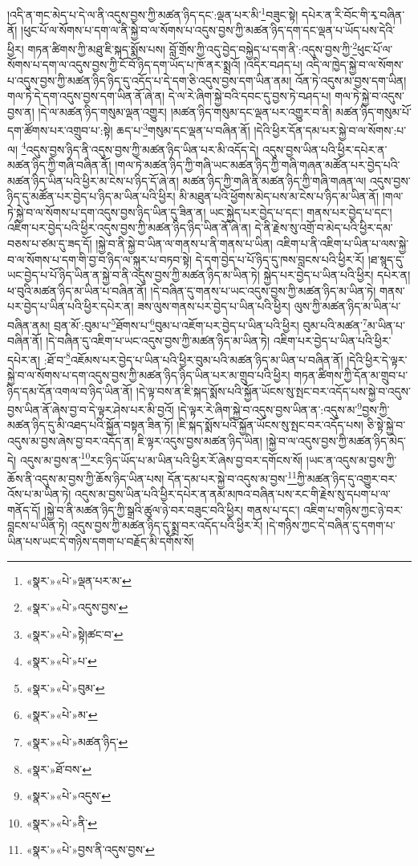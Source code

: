 །འདི་ན་གང་མེད་པ་དེ་ལ་ནི་འདུས་བྱས་ཀྱི་མཚན་ཉིད་དང་:ལྡན་པར་མི་\footnote{«སྣར་»«པེ་»ལྡན་པར་མ་}བཟུང་སྟེ། དཔེར་ན་རི་བོང་གི་རྭ་བཞིན་ནོ། །ཕུང་པོ་ལ་སོགས་པ་དག་ལ་ནི་སྐྱེ་བ་ལ་སོགས་པ་འདུས་བྱས་ཀྱི་མཚན་ཉིད་དག་དང་ལྡན་པ་ཡོད་པས་དེའི་ཕྱིར། གཏན་ཚིགས་ཀྱི་མཐུ་ཇི་སྐད་སྨོས་པས། བློ་གྲོས་ཀྱི་འདུ་བྱེད་བསྐྱེད་པ་དག་ནི་:འདུས་བྱས་ཀྱི་\footnote{«སྣར་»«པེ་»འདུས་བྱས་}ཕུང་པོ་ལ་སོགས་པ་དག་ལ་འདུས་བྱས་ཀྱི་ངོ་བོ་ཉིད་དག་ཡོད་པ་ཁོ་ནར་སྨྲའོ། །འདིར་བཤད་པ། འདི་ལ་ཁྱེད་སྐྱེ་བ་ལ་སོགས་པ་འདུས་བྱས་ཀྱི་མཚན་ཉིད་ཉིད་དུ་འདོད་པ་དེ་དག་ཅི་འདུས་བྱས་དག་ཡིན་ནམ། འོན་ཏེ་འདུས་མ་བྱས་དག་ཡིན། གལ་ཏེ་དེ་དག་འདུས་བྱས་དག་ཡིན་ནོ་ཞེ་ན། དེ་ལ་རེ་ཞིག་སྐྱེ་བའི་དབང་དུ་བྱས་ཏེ་བཤད་པ། གལ་ཏེ་སྐྱེ་བ་འདུས་བྱས་ན། །དེ་ལ་མཚན་ཉིད་གསུམ་ལྡན་འགྱུར། །མཚན་ཉིད་གསུམ་དང་ལྡན་པར་འགྱུར་བ་ནི། མཚན་ཉིད་གསུམ་པོ་དག་ཚོགས་པར་འགྲུབ་པ་:སྟེ། ཆད་པ་\footnote{«སྣར་»«པེ་»སྟེ།ཚང་བ་}གསུམ་དང་ལྡན་པ་བཞིན་ནོ། །དེའི་ཕྱིར་དོན་དམ་པར་སྐྱེ་བ་ལ་སོགས་:པ་ལ། \footnote{«སྣར་»«པེ་»པ་}འདུས་བྱས་ཉིད་ནི་འདུས་བྱས་ཀྱི་མཚན་ཉིད་ཡིན་པར་མི་འདོད་དེ། འདུས་བྱས་ཡིན་པའི་ཕྱིར་དཔེར་ན་མཚན་ཉིད་ཀྱི་གཞི་བཞིན་ནོ། །གལ་ཏེ་མཚན་ཉིད་ཀྱི་གཞི་ཡང་མཚན་ཉིད་ཀྱི་གཞི་གཞན་མཚོན་པར་བྱེད་པའི་མཚན་ཉིད་ཡིན་པའི་ཕྱིར་མ་ངེས་པ་ཉིད་དོ་ཞེ་ན། མཚན་ཉིད་ཀྱི་གཞི་ནི་མཚན་ཉིད་ཀྱི་གཞི་གཞན་ལ། འདུས་བྱས་ཉིད་དུ་མཚོན་པར་བྱེད་པ་ཉིད་མ་ཡིན་པའི་ཕྱིར། མི་མཐུན་པའི་ཕྱོགས་མེད་པས་མ་ངེས་པ་ཉིད་མ་ཡིན་ནོ། །གལ་ཏེ་སྐྱེ་བ་ལ་སོགས་པ་དག་འདུས་བྱས་ཉིད་ཡིན་དུ་ཟིན་ན། ཡང་སྐྱེད་པར་བྱེད་པ་དང་། གནས་པར་བྱེད་པ་དང་། འཇིག་པར་བྱེད་པའི་ཕྱིར་འདུས་བྱས་ཀྱི་མཚན་ཉིད་ཉིད་ཡིན་ནོ་ཞེ་ན། དེ་ནི་རྗེས་སུ་འགྲོ་བ་མེད་པའི་ཕྱིར་དམ་བཅས་པ་ཙམ་དུ་ཟད་དོ། །སྐྱེ་བ་ནི་སྐྱེ་བ་ཡིན་ལ་གནས་པ་ནི་གནས་པ་ཡིན། འཇིག་པ་ནི་འཇིག་པ་ཡིན་པ་ལས་སྐྱེ་བ་ལ་སོགས་པ་དག་གི་བྱ་བ་ཉིད་ལ་སྐུར་པ་བཏབ་སྟེ། དེ་དག་བྱེད་པ་པོ་ཉིད་དུ་ཁས་བླངས་པའི་ཕྱིར་རོ། །ཐ་སྙད་དུ་ཡང་བྱེད་པ་པོ་ཉིད་ཡིན་ན་སྐྱེ་བ་ནི་འདུས་བྱས་ཀྱི་མཚན་ཉིད་མ་ཡིན་ཏེ། སྐྱེད་པར་བྱེད་པ་ཡིན་པའི་ཕྱིར། དཔེར་ན། ཕ་བུའི་མཚན་ཉིད་མ་ཡིན་པ་བཞིན་ནོ། །དེ་བཞིན་དུ་གནས་པ་ཡང་འདུས་བྱས་ཀྱི་མཚན་ཉིད་མ་ཡིན་ཏེ། གནས་པར་བྱེད་པ་ཡིན་པའི་ཕྱིར་དཔེར་ན། ཟས་ལུས་གནས་པར་བྱེད་པ་ཡིན་པའི་ཕྱིར། ལུས་ཀྱི་མཚན་ཉིད་མ་ཡིན་པ་བཞིན་ནམ། བྲན་མོ་:བུམ་པ་\footnote{«སྣར་»«པེ་»བུམ་}ཐོགས་པ་\footnote{«སྣར་»«པེ་»མ་}བུམ་པ་འཇོག་པར་བྱེད་པ་ཡིན་པའི་ཕྱིར། བུམ་པའི་མཚན་\footnote{«སྣར་»«པེ་»མཚན་ཉིད་}མ་ཡིན་པ་བཞིན་ནོ། །དེ་བཞིན་དུ་འཇིག་པ་ཡང་འདུས་བྱས་ཀྱི་མཚན་ཉིད་མ་ཡིན་ཏེ། འཇིག་པར་བྱེད་པ་ཡིན་པའི་ཕྱིར་དཔེར་ན། :ཐོ་བ་\footnote{«སྣར་»ཐོ་བས་}འཇོམས་པར་བྱེད་པ་ཡིན་པའི་ཕྱིར་བུམ་པའི་མཚན་ཉིད་མ་ཡིན་པ་བཞིན་ནོ། །དེའི་ཕྱིར་དེ་ལྟར་སྐྱེ་བ་ལ་སོགས་པ་དག་འདུས་བྱས་ཀྱི་མཚན་ཉིད་ཉིད་ཡིན་པར་མ་གྲུབ་པའི་ཕྱིར། གཏན་ཚིགས་ཀྱི་དོན་མ་གྲུབ་པ་ཉིད་དམ་དོན་འགལ་བ་ཉིད་ཡིན་ནོ། །དེ་ལྟ་བས་ན་ཇི་སྐད་སྨོས་པའི་སྐྱོན་ཡོངས་སུ་སྤང་བར་འདོད་པས་སྐྱེ་བ་འདུས་བྱས་ཡིན་ནོ་ཞེས་བྱ་བ་དེ་ལྟར་ཤེས་པར་མི་བྱའོ། །དེ་ལྟར་རེ་ཞིག་སྐྱེ་བ་འདུས་བྱས་ཡིན་ན་:འདུས་མ་\footnote{«སྣར་»«པེ་»འདུས་}བྱས་ཀྱི་མཚན་ཉིད་དུ་མི་འཐད་པའི་སྐྱོན་བསྟན་ཟིན་ཏོ། །ཇི་སྐད་སྨོས་པའི་སྐྱོན་ཡོངས་སུ་སྤང་བར་འདོད་པས། ཅི་སྟེ་སྐྱེ་བ་འདུས་མ་བྱས་ཞེས་བྱ་བར་འདོད་ན། ཇི་ལྟར་འདུས་བྱས་མཚན་ཉིད་ཡིན། །སྐྱེ་བ་ལ་འདུས་བྱས་ཀྱི་མཚན་ཉིད་མེད་དེ། འདུས་མ་བྱས་ན་\footnote{«སྣར་»«པེ་»ནི་}རང་ཉིད་ཡོད་པ་མ་ཡིན་པའི་ཕྱིར་རོ་ཞེས་བྱ་བར་དགོངས་སོ། །ཡང་ན་འདུས་མ་བྱས་ཀྱི་ཆོས་ནི་འདུས་མ་བྱས་ཀྱི་ཆོས་ཉིད་ཡིན་པས། དོན་དམ་པར་སྐྱེ་བ་འདུས་མ་བྱས་\footnote{«སྣར་»«པེ་»བྱས་ནི་འདུས་བྱས་}ཀྱི་མཚན་ཉིད་དུ་འགྱུར་བར་འོས་པ་མ་ཡིན་ཏེ། འདུས་མ་བྱས་ཡིན་པའི་ཕྱིར་དཔེར་ན་ནམ་མཁའ་བཞིན་པས་རང་གི་རྗེས་སུ་དཔག་པ་ལ་གནོད་དོ། །སྐྱེ་བ་ནི་མཚན་ཉིད་ཀྱི་སྒྲའི་ཚུལ་ཉེ་བར་བཟུང་བའི་ཕྱིར། གནས་པ་དང་། འཇིག་པ་གཉིས་ཀྱང་ཉེ་བར་བླངས་པ་ཡིན་ཏེ། འདུས་བྱས་ཀྱི་མཚན་ཉིད་དུ་སྨྲ་བར་འདོད་པའི་ཕྱིར་རོ། །དེ་གཉིས་ཀྱང་དེ་བཞིན་དུ་དགག་པ་ཡིན་པས་ཡང་དེ་གཉིས་དགག་པ་བརྗོད་མི་དགོས་སོ། 